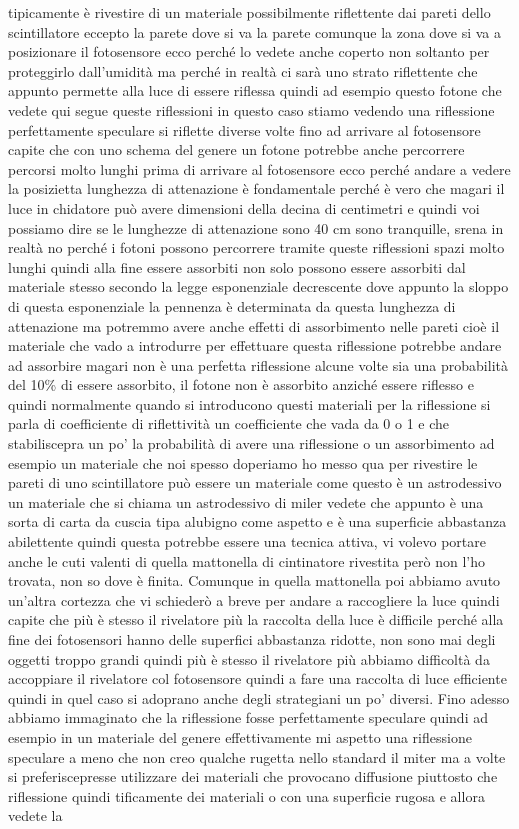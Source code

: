 tipicamente è rivestire di un materiale possibilmente riflettente dai pareti dello scintillatore eccepto la parete dove si va la parete comunque la zona dove si va a posizionare il fotosensore ecco perché lo vedete anche coperto non soltanto per proteggirlo dall'umidità ma perché in realtà ci sarà uno strato riflettente che appunto permette alla luce di essere riflessa quindi ad esempio questo fotone che vedete qui segue queste riflessioni in questo caso stiamo vedendo una riflessione perfettamente speculare si riflette diverse volte fino ad arrivare al fotosensore capite che con uno schema del genere un fotone potrebbe anche percorrere percorsi molto lunghi prima di arrivare al fotosensore ecco perché andare a vedere la posizietta lunghezza di attenazione è fondamentale perché è vero che magari il luce in chidatore può avere dimensioni della decina di centimetri e quindi voi possiamo dire se le lunghezze di attenazione sono 40 cm sono tranquille, srena in realtà no perché i fotoni possono percorrere tramite queste riflessioni spazi molto lunghi quindi alla fine essere assorbiti non solo possono essere assorbiti dal materiale stesso secondo la legge esponenziale decrescente dove appunto la sloppo di questa esponenziale la pennenza è determinata da questa lunghezza di attenazione ma potremmo avere anche effetti di assorbimento nelle pareti cioè il materiale che vado a introdurre per effettuare questa riflessione potrebbe andare ad assorbire magari non è una perfetta riflessione alcune volte sia una probabilità del 10\% di essere assorbito, il fotone non è assorbito anziché essere riflesso e quindi normalmente quando si introducono questi materiali per la riflessione si parla di coefficiente di riflettività un coefficiente che vada da 0 o 1 e che stabiliscepra un po' la probabilità di avere una riflessione o un assorbimento ad esempio un materiale che noi spesso doperiamo ho messo qua per rivestire le pareti di uno scintillatore può essere un materiale come questo è un astrodessivo un materiale che si chiama un astrodessivo di miler vedete che appunto è una sorta di carta da cuscia tipa alubigno come aspetto e è una superficie abbastanza abilettente quindi questa potrebbe essere una tecnica attiva, vi volevo portare anche le cuti valenti di quella mattonella di cintinatore rivestita però non l'ho trovata, non so dove è finita. Comunque in quella mattonella poi abbiamo avuto un'altra cortezza che vi schiederò a breve per andare a raccogliere la luce quindi capite che più è stesso il rivelatore più la raccolta della luce è difficile perché alla fine dei fotosensori hanno delle superfici abbastanza ridotte, non sono mai degli oggetti troppo grandi quindi più è stesso il rivelatore più abbiamo difficoltà da accoppiare il rivelatore col fotosensore quindi a fare una raccolta di luce efficiente quindi in quel caso si adoprano anche degli strategiani un po' diversi. Fino adesso abbiamo immaginato che la riflessione fosse perfettamente speculare quindi ad esempio in un materiale del genere effettivamente mi aspetto una riflessione speculare a meno che non creo qualche rugetta nello standard il miter ma a volte si preferiscepresse utilizzare dei materiali che provocano diffusione piuttosto che riflessione quindi tificamente dei materiali o con una superficie rugosa e allora vedete la 